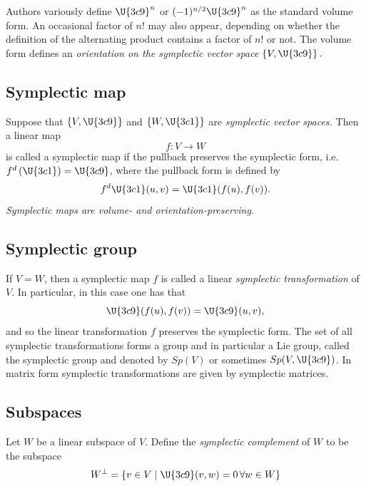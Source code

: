 \documentclass{conm-p-l}
\theoremstyle{definition}
\theoremstyle{remark}
\numberwithin{equation}{section}
\theoremstyle{plain}
\begin{document}
Authors variously define $\U{3c9} ^{n}$ or $(-1)^{n/2}\U{3c9} ^{n}$ as the
standard volume form. An occasional factor of $n!$ may also appear,
depending on whether the definition of the alternating product contains a
factor of $n!$ or not. The volume form defines an \emph{orientation on the
symplectic vector space} $\left\{ V,\U{3c9} \right\} .$

\subsection{Symplectic map}

Suppose that $\left\{ V,\U{3c9} \right\} $ and $\left\{ W,\U{3c1} \right\} $
are \emph{symplectic vector spaces.} Then a linear map 
\begin{equation}
f:V\rightarrow W
\end{equation}
is called a symplectic map if the pullback preserves the symplectic form,
i.e. $f^{d}\left( \U{3c1} \right) =\U{3c9} $, where the pullback form is
defined by 
\begin{equation}
f^{d}\U{3c1} (u,v)=\U{3c1} (f(u),f(v)).
\end{equation}
\emph{Symplectic maps are volume- and orientation-preserving}.

\subsection{Symplectic group}

If $V=W$, then a symplectic map $f$ is called a linear \emph{symplectic
transformation} of $V$. In particular, in this case one has that 
\begin{equation}
\U{3c9} (f(u),f(v))=\U{3c9} (u,v),
\end{equation}
and so the linear transformation $f$ preserves the symplectic form. The set
of all symplectic transformations forms a group and in particular a Lie
group, called the symplectic group and denoted by $Sp(V)$ or sometimes $Sp(V,%
\U{3c9} )$. In matrix form symplectic transformations are given by
symplectic matrices.

\subsection{Subspaces}

Let $W$ be a linear subspace of $V$. Define the \emph{symplectic complement}
of $W$ to be the subspace%
\begin{equation}
W^{\bot }=\{v\in V\mid \U{3c9} (v,w)=0\,\forall w\in W\}
\end{equation}
\end{document}
